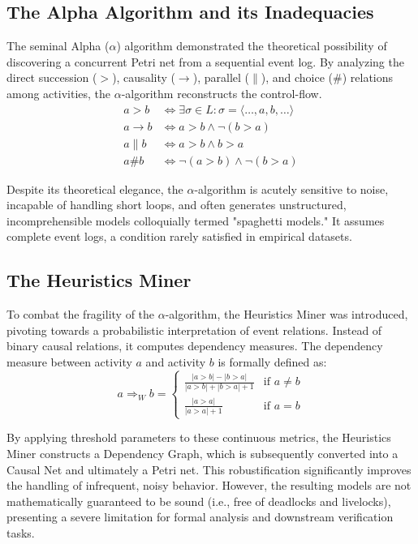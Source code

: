 \subsection{The Alpha Algorithm and its Inadequacies}
The seminal Alpha ($\alpha$) algorithm demonstrated the theoretical possibility of discovering a concurrent Petri net from a sequential event log. By analyzing the direct succession ($>$), causality ($\rightarrow$), parallel ($\parallel$), and choice ($\#$) relations among activities, the $\alpha$-algorithm reconstructs the control-flow.
\begin{align*}
a > b &\iff \exists \sigma \in L: \sigma = \langle \dots, a, b, \dots \rangle \\
a \rightarrow b &\iff a > b \land \neg(b > a) \\
a \parallel b &\iff a > b \land b > a \\
a \# b &\iff \neg(a > b) \land \neg(b > a)
\end{align*}

Despite its theoretical elegance, the $\alpha$-algorithm is acutely sensitive to noise, incapable of handling short loops, and often generates unstructured, incomprehensible models colloquially termed "spaghetti models." It assumes complete event logs, a condition rarely satisfied in empirical datasets.

\subsection{The Heuristics Miner}
To combat the fragility of the $\alpha$-algorithm, the Heuristics Miner was introduced, pivoting towards a probabilistic interpretation of event relations. Instead of binary causal relations, it computes dependency measures. The dependency measure between activity $a$ and activity $b$ is formally defined as:
\begin{equation}
a \Rightarrow_W b = \begin{cases}
    \frac{|a > b| - |b > a|}{|a > b| + |b > a| + 1} & \text{if } a \neq b \\
    \frac{|a > a|}{|a > a| + 1} & \text{if } a = b
\end{cases}
\end{equation}

By applying threshold parameters to these continuous metrics, the Heuristics Miner constructs a Dependency Graph, which is subsequently converted into a Causal Net and ultimately a Petri net. This robustification significantly improves the handling of infrequent, noisy behavior. However, the resulting models are not mathematically guaranteed to be sound (i.e., free of deadlocks and livelocks), presenting a severe limitation for formal analysis and downstream verification tasks.

